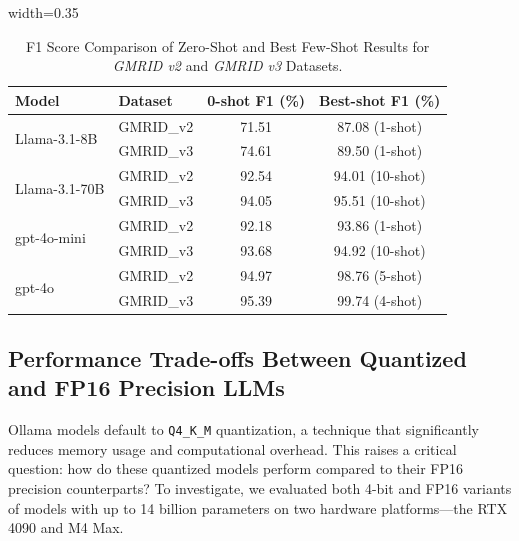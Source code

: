 \documentclass[conference]{IEEEtran}
\begin{document}
\begin{table}[htbp]
\centering
\begin{adjustbox}{width=0.35\textwidth}
\begin{tabular}{llcc}
\toprule
\textbf{Model} & \textbf{Dataset} & \textbf{0-shot F1 (\%)} & \textbf{Best-shot F1 (\%)} \\
\midrule
\multirow{2}{*}{Llama-3.1-8B} & GMRID\_v2 & 71.51 & 87.08 (1-shot) \\
                              & GMRID\_v3 & 74.61 & 89.50 (1-shot) \\
\midrule
\multirow{2}{*}{Llama-3.1-70B} & GMRID\_v2 & 92.54 & 94.01 (10-shot) \\
                               & GMRID\_v3 & 94.05 & 95.51 (10-shot) \\
\midrule
\multirow{2}{*}{gpt-4o-mini} & GMRID\_v2 & 92.18 & 93.86 (1-shot) \\
                             & GMRID\_v3 & 93.68 & 94.92 (10-shot) \\
\midrule
\multirow{2}{*}{gpt-4o} & GMRID\_v2 & 94.97 & 98.76 (5-shot) \\
                        & GMRID\_v3 & 95.39 & 99.74 (4-shot) \\
\bottomrule
\end{tabular}
\end{adjustbox}
\caption{F1 Score Comparison of Zero-Shot and Best Few-Shot Results for \textit{GMRID v2} and \textit{GMRID v3} Datasets.}
\label{tab:few_shot_results}
\end{table}

\subsection{Performance Trade-offs Between Quantized and FP16 Precision LLMs}
\label{sec:quantization}

Ollama models default to \texttt{Q4\_K\_M} quantization, a technique that significantly reduces memory usage and computational overhead. This raises a critical question: how do these quantized models perform compared to their FP16 precision counterparts? To investigate, we evaluated both 4-bit and FP16 variants of models with up to 14 billion parameters on two hardware platforms—the RTX 4090 and M4 Max.
\end{document}

